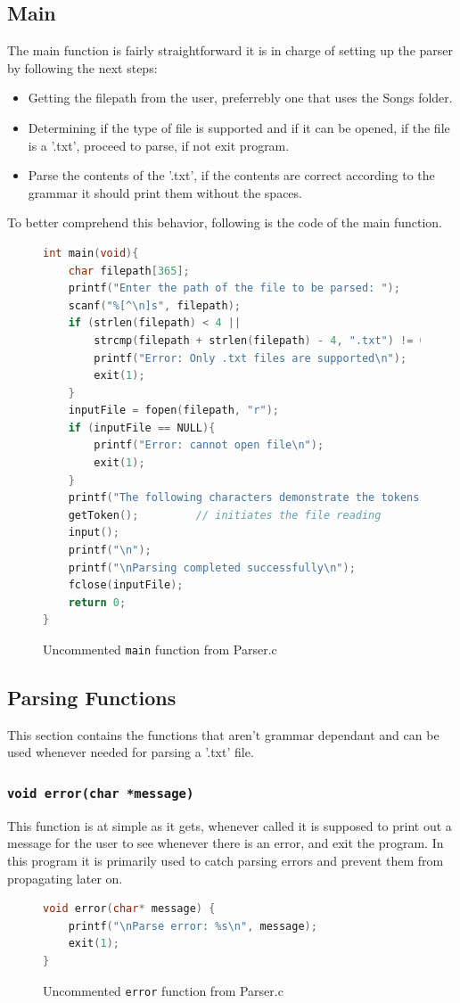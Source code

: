 \documentclass{article}
\begin{document}
\subsection{Main}
The main function is fairly straightforward it is in charge of setting up the parser by following the next steps:
\begin{itemize}
    \item Getting the filepath from the user, preferrebly one that uses the Songs folder.
    \item Determining if the type of file is supported and if it can be opened, if the file is a '.txt', proceed to parse, if not exit program. 
    \item Parse the contents of the '.txt', if the contents are correct according to the grammar it should print them without the spaces.
\end{itemize}
To better comprehend this behavior, following is the code of the main function. 
\begin{figure}[H]
    \begin{lstlisting}[language=C]
int main(void){
    char filepath[365];
    printf("Enter the path of the file to be parsed: ");
    scanf("%[^\n]s", filepath);
    if (strlen(filepath) < 4 || 
        strcmp(filepath + strlen(filepath) - 4, ".txt") != 0) {
        printf("Error: Only .txt files are supported\n");
        exit(1);
    }
    inputFile = fopen(filepath, "r");
    if (inputFile == NULL){
        printf("Error: cannot open file\n");
        exit(1);
    }
    printf("The following characters demonstrate the tokens being parsed.\n\n");
    getToken();         // initiates the file reading 
    input();
    printf("\n");
    printf("\nParsing completed successfully\n");
    fclose(inputFile);
    return 0;
}
    \end{lstlisting}
    \caption{Uncommented \texttt{main} function from Parser.c}
\end{figure}
\subsection{Parsing Functions}
This section contains the functions that aren't grammar dependant and can be used whenever needed for parsing a '.txt' file.
\subsubsection{\texttt{void error(char *message)}}
This function is at simple as it gets, whenever called it is supposed to print out a message for the user to see whenever there is an error, and exit the program. In this program it is primarily used to catch parsing errors and prevent them from propagating later on.
\begin{figure}[H]
    \begin{lstlisting}[language=C]
void error(char* message) {
    printf("\nParse error: %s\n", message);
    exit(1);
}
    \end{lstlisting}
    \caption{Uncommented \texttt{error} function from Parser.c}
\end{figure}
\end{document}
